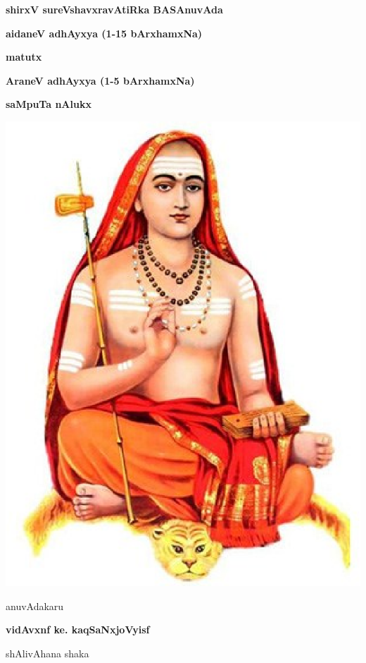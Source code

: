 \thispagestyle{empty}
\begin{center}
{\Huge\bfseries shirxV sureVshavxravAtiRka BASAnuvAda}
\bigskip

{\large\bfseries aidaneV adhAyxya (1-15 bArxhamxNa)}
\smallskip

{\large\bfseries matutx}
\smallskip

{\large\bfseries AraneV adhAyxya (1-5 bArxhamxNa)}
\bigskip

{\Large\bfseries saMpuTa nAlukx}
\vfill

\includegraphics[scale=0.7]{figures/figure1.eps}

\vfill

anuvAdakaru
\smallskip

{\large\bfseries vidAvxnf ke. kaqSaNxjoVyisf}

\smallskip
shAlivAhana shaka

\end{center}
